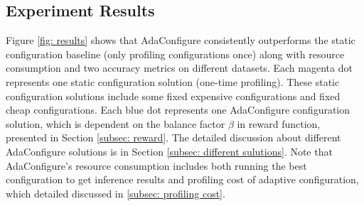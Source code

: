 \begin{table}[!t]
	\centering
	\caption{Experiment parameters.}
	\label{tab: parameters}
\end{table}

\subsection{Experiment Results}
Figure \ref{fig: results} shows that AdaConfigure consistently outperforms the static configuration baseline (only profiling configurations once) along with resource consumption and two accuracy metrics on different datasets. Each magenta dot represents one static configuration solution (one-time profiling).
These static configuration solutions include some fixed expensive configurations and fixed cheap configurations. 
Each blue dot represents one AdaConfigure configuration solution, which is dependent on the balance factor $\beta$ in reward function, presented in Section \ref{subsec: reward}. The detailed discussion about different AdaConfigure solutions is in Section \ref{subsec: different sulutions}. Note that AdaConfigure's resource consumption includes both running the best configuration to get inference results and profiling cost of adaptive configuration, which detailed discussed in \ref{subsec: profiling cost}. 

